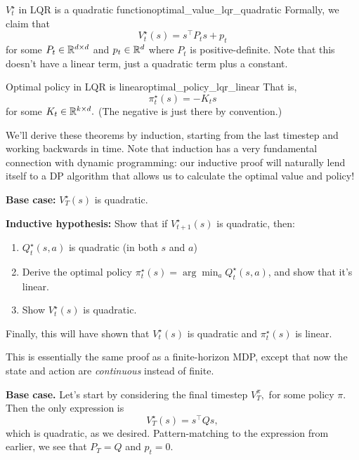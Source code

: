 \documentclass[../main/main]{subfiles}
\begin{document}
\begin{theorem}{$V^\star_t$ in LQR is a quadratic function}{optimal_value_lqr_quadratic}
    Formally, we claim that \[
        V^\star_t(s) = s^\top P_t s + p_t
    \]
    for some $P_t \in \mathbb{R}^{d \times d}$ and $p_t \in \mathbb{R}^d$ where $P_t$ is positive-definite.
    Note that this doesn't have a linear term,
    just a quadratic term plus a constant.
\end{theorem}


\begin{theorem}{Optimal policy in LQR is linear}{optimal_policy_lqr_linear}
    That is, \[
        \pi^\star_t (s) = - K_t s
    \]
    for some $K_t \in \mathbb{R}^{k \times d}.$ (The negative is just there by convention.)
\end{theorem}


We'll derive these theorems by induction, starting from the last timestep and
working backwards in time. Note that induction has a very fundamental connection
with dynamic programming: our inductive proof will naturally lend itself to a DP
algorithm that allows us to calculate the optimal value and policy!

\textbf{Base case:} $V^\star_T(s)$ is quadratic.

\textbf{Inductive hypothesis:} Show that if $V^\star_{t+1}(s)$ is quadratic, then:
\begin{enumerate}
    \item $Q^\star_t(s, a)$ is quadratic (in both $s$ and $a$)
    \item Derive the optimal policy $\pi^\star_t(s) = \arg \min_a Q^\star_t(s, a)$, and show that it's linear.
    \item Show $V^\star_t(s)$ is quadratic.
\end{enumerate}

Finally, this will have shown that $V^\star_t(s)$ is quadratic and $\pi^\star_t(s)$ is linear.

This is essentially the same proof as a finite-horizon MDP,
except that now the state and action are \emph{continuous} instead of finite.

\textbf{Base case.} Let's start by considering the final timestep $V^\pi_T,$ for some policy $\pi.$
Then the only expression is \[
    V^\star_T(s) = s^\top Q s,
\]
which is quadratic, as we desired. Pattern-matching to the expression from earlier,
we see that $P_T = Q$ and $p_t = 0.$
\end{document}
